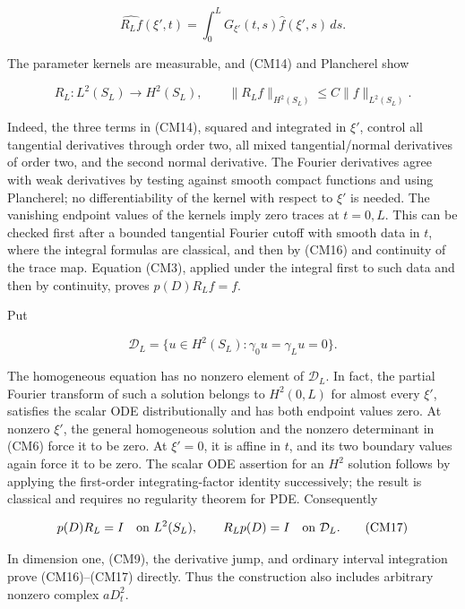 \documentclass[
  11pt,
]{article}
\makeatletter
\let\ReaderOriginalAnchorStart\hyper@anchorstart
\let\ReaderOriginalAnchorEnd\hyper@anchorend
\let\ReaderPendingAliases\@empty
\def\ReaderArmAliases#1{\gdef\ReaderPendingAliases{#1}}
\def\hyper@anchorstart#1{\ReaderIfNativeAnchorTF{#1}{\ReaderPendingAliases\global\let\ReaderPendingAliases\@empty}{}\ReaderOriginalAnchorStart{#1}}
\makeatother
\begin{document}
\[
\widehat{R_Lf}(\xi',t)=\int_0^L G_{\xi'}(t,s)\widehat f(\xi',s)\,ds.
\tag{CM15}
\]

The parameter kernels are measurable, and (CM14) and Plancherel show

\[
R_L:L^2(S_L)\longrightarrow H^2(S_L),\qquad
\|R_Lf\|_{H^2(S_L)}\leq C\|f\|_{L^2(S_L)}.
\tag{CM16}
\]

Indeed, the three terms in (CM14), squared and integrated in \(\xi'\),
control all tangential derivatives through order two, all mixed
tangential/normal derivatives of order two, and the second normal
derivative. The Fourier derivatives agree with weak derivatives by
testing against smooth compact functions and using Plancherel; no
differentiability of the kernel with respect to \(\xi'\) is needed. The
vanishing endpoint values of the kernels imply zero traces at \(t=0,L\).
This can be checked first after a bounded tangential Fourier cutoff with
smooth data in \(t\), where the integral formulas are classical, and
then by (CM16) and continuity of the trace map. Equation (CM3), applied
under the integral first to such data and then by continuity, proves
\(p(D)R_Lf=f\).

Put

\[
\mathcal D_L=\{u\in H^2(S_L):\gamma_0u=\gamma_Lu=0\}.
\]

The homogeneous equation has no nonzero element of \(\mathcal D_L\). In
fact, the partial Fourier transform of such a solution belongs to
\(H^2(0,L)\) for almost every \(\xi'\), satisfies the scalar ODE
distributionally and has both endpoint values zero. At nonzero \(\xi'\),
the general homogeneous solution and the nonzero determinant in (CM6)
force it to be zero. At \(\xi'=0\), it is affine in \(t\), and its two
boundary values again force it to be zero. The scalar ODE assertion for
an \(H^2\) solution follows by applying the first-order
integrating-factor identity successively; the result is classical and
requires no regularity theorem for PDE. Consequently

\[
p(D)R_L=I\quad\hbox{on }L^2(S_L),\qquad
R_Lp(D)=I\quad\hbox{on }\mathcal D_L.
\tag{CM17}
\]

In dimension one, (CM9), the derivative jump, and ordinary interval
integration prove (CM16)--(CM17) directly. Thus the construction also
includes arbitrary nonzero complex \(aD_t^2\).

\ReaderArmAliases{\ReaderOriginalAnchorStart{cm4-exact-local-inverse-identities-and-small-variable-coefficients}\ReaderOriginalAnchorEnd\begingroup\expandafter\def\csname @currentHref\endcsname{cm4-exact-local-inverse-identities-and-small-variable-coefficients}\label{cm4-exact-local-inverse-identities-and-small-variable-coefficients}\endgroup\ReaderOriginalAnchorStart{exact-local-inverse-identities-and-small-variable-coefficients}\ReaderOriginalAnchorEnd}
\end{document}
